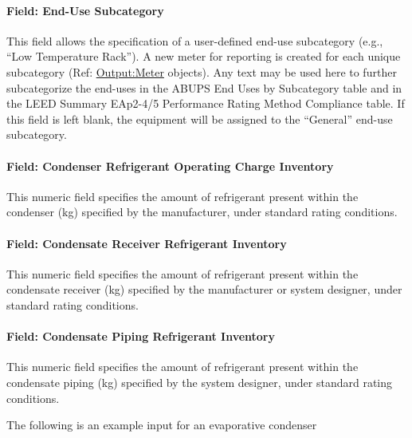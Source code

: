\paragraph{Field: End-Use Subcategory}\label{field-end-use-subcategory-5-000}

This field allows the specification of a user-defined end-use subcategory (e.g., ``Low Temperature Rack''). A new meter for reporting is created for each unique subcategory (Ref: \hyperref[outputmeter-and-outputmetermeterfileonly]{Output:Meter} objects). Any text may be used here to further subcategorize the end-uses in the ABUPS End Uses by Subcategory table and in the LEED Summary EAp2-4/5 Performance Rating Method Compliance table. If this field is left blank, the equipment will be assigned to the ``General'' end-use subcategory.

\paragraph{Field: Condenser Refrigerant Operating Charge Inventory}\label{field-condenser-refrigerant-operating-charge-inventory-1}

This numeric field specifies the amount of refrigerant present within the condenser (kg) specified by the manufacturer, under standard rating conditions.

\paragraph{Field: Condensate Receiver Refrigerant Inventory}\label{field-condensate-receiver-refrigerant-inventory-1}

This numeric field specifies the amount of refrigerant present within the condensate receiver (kg) specified by the manufacturer or system designer, under standard rating conditions.

\paragraph{Field: Condensate Piping Refrigerant Inventory}\label{field-condensate-piping-refrigerant-inventory-1}

This numeric field specifies the amount of refrigerant present within the condensate piping (kg) specified by the system designer, under standard rating conditions.

The following is an example input for an evaporative condenser

